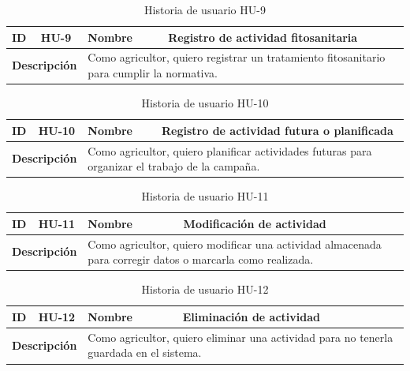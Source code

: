 \begin{table}[H]
    \centering
    \begin{tabular}{|p{2cm}|p{4cm}|p{2cm}|p{4cm}|}
        \hline
        \textbf{ID} & HU-9 & \textbf{Nombre} & Registro de actividad fitosanitaria \\
        \hline
        \multicolumn{2}{|p{6cm}|}{\textbf{Descripción}} & \multicolumn{2}{p{6cm}|}{Como agricultor, quiero registrar un tratamiento fitosanitario para cumplir la normativa.} \\
        \hline
    \end{tabular}
    \caption{Historia de usuario HU-9}
    \label{tab:hu_9}
\end{table}

\begin{table}[H]
    \centering
    \begin{tabular}{|p{2cm}|p{4cm}|p{2cm}|p{4cm}|}
        \hline
        \textbf{ID} & HU-10 & \textbf{Nombre} & Registro de actividad futura o planificada \\
        \hline
        \multicolumn{2}{|p{6cm}|}{\textbf{Descripción}} & \multicolumn{2}{p{6cm}|}{Como agricultor, quiero planificar actividades futuras para organizar el trabajo de la campaña.} \\
        \hline
    \end{tabular}
    \caption{Historia de usuario HU-10}
    \label{tab:hu_10}
\end{table}

\begin{table}[H]
    \centering
    \begin{tabular}{|p{2cm}|p{4cm}|p{2cm}|p{4cm}|}
        \hline
        \textbf{ID} & HU-11 & \textbf{Nombre} & Modificación de actividad \\
        \hline
        \multicolumn{2}{|p{6cm}|}{\textbf{Descripción}} & \multicolumn{2}{p{6cm}|}{Como agricultor, quiero modificar una actividad almacenada para corregir datos o marcarla como realizada.} \\
        \hline
    \end{tabular}
    \caption{Historia de usuario HU-11}
    \label{tab:hu_11}
\end{table}

\begin{table}[H]
    \centering
    \begin{tabular}{|p{2cm}|p{4cm}|p{2cm}|p{4cm}|}
        \hline
        \textbf{ID} & HU-12 & \textbf{Nombre} & Eliminación de actividad \\
        \hline
        \multicolumn{2}{|p{6cm}|}{\textbf{Descripción}} & \multicolumn{2}{p{6cm}|}{Como agricultor, quiero eliminar una actividad para no tenerla guardada en el sistema.} \\
        \hline
    \end{tabular}
    \caption{Historia de usuario HU-12}
    \label{tab:hu_12}
\end{table}

